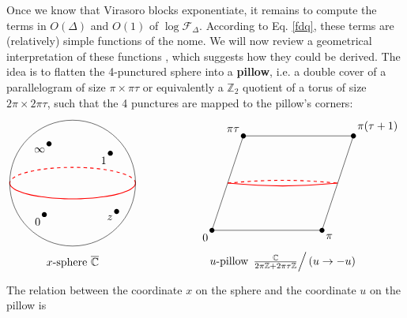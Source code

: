 \documentclass[12pt, a4paper]{article}
\newcommand{\myindex}[1]{\textbf{\boldmath #1}}
\theoremstyle{break}
\begin{document}
Once we know that Virasoro blocks exponentiate, it remains to compute the terms in $O(\Delta)$ and $O(1)$ of $\log \mathcal{F}_\Delta$. According to Eq. \eqref{fdq}, these terms are (relatively) simple functions of the nome. We will now review a geometrical interpretation of these functions \cite{msz15}, which suggests how they could be derived. The idea is to flatten the 4-punctured sphere into a \myindex{pillow}, i.e. a double cover of a parallelogram of size $\pi\times \pi \tau$ or equivalently a $\mathbb{Z}_2$ quotient of a torus of size $2\pi\times 2\pi\tau$, such that the 4 punctures are mapped to the pillow's corners:
\begin{align}
 \begin{tikzpicture}[scale = .5, baseline=(base)]
 \coordinate (base) at (0, 0);
  \draw [thick, red] plot [domain = 0:-180, smooth] ({4*cos(\x)}, {sin(\x)});
  \draw [thick, red, dashed] plot [domain = 0:180, smooth] ({4*cos(\x)}, {sin(\x)});
  \draw (0, 0) circle [radius = 4];
  \draw (-1.8,-2) node [fill, circle, minimum size = 1.6mm, inner sep = 0]{} node[below left] {$0$};
  \draw (2.8, -1.8) node [fill, circle, minimum size = 1.6mm, inner sep = 0]{} node[below left] {$z$};
  \draw (-1.5, 2.5) node [fill, circle, minimum size = 1.6mm, inner sep = 0]{} node[below left] {$\infty$};
  \draw (2.4, 1.9) node [fill, circle, minimum size = 1.6mm, inner sep = 0]{} node[below left] {$1$};
  \draw (0, -5) node {$x$-sphere $\overline{\mathbb{C}}$};
 \end{tikzpicture}
 \hspace{2cm}
 \begin{tikzpicture}[scale = .5, baseline=(base)]
 \coordinate (base) at (0, 0);
  \draw [thick, red] (-3, 0) to [out = -5, in = -175] (4, 0);
   \draw [thick, red, dashed] (-3, 0) to [out = 5, in = 175] (4, 0);
  \draw (-4, -3) node [below left] {$0$} node [fill, circle, minimum size = 1.6mm, inner sep = 0]{} -- (-2,3) node [above left] {$\pi\tau$} node [fill, circle, minimum size = 1.6mm, inner sep = 0]{} -- (5, 3) node [above right] {$\pi(\tau +1)$} node [fill, circle, minimum size = 1.6mm, inner sep = 0]{} -- (3, -3) node [below right] {$\pi$} node [fill, circle, minimum size = 1.6mm, inner sep = 0]{} -- cycle; 
  \draw (.5, -5) node {$u$-pillow $\left. \frac{\mathbb{C}}{2\pi\mathbb{Z}+2\pi\tau\mathbb{Z}}\right/\left(u\to -u\right)$};
 \end{tikzpicture}
 \label{fig:pillow}
\end{align}
The relation between the coordinate $x$ on the sphere and the coordinate $u$ on the pillow is 
\end{document}
